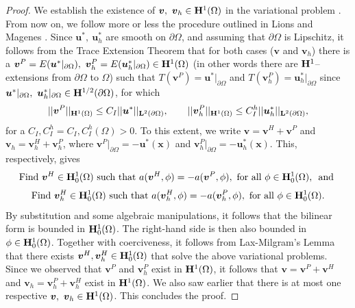 \documentclass[pdflatex,sn-mathphys-num]{sn-jnl}
\newtheorem*{lemma star}{Lemma}
\begin{document}
\begin{appendices}
\begin{proof}
We establish the existence of ${\boldsymbol v},~{\boldsymbol v}_h \in {\bf H}^1(\Omega)$ in the variational problem \citep{Fichera1973,Lions2005}. From now on, we follow more or less the procedure outlined in Lions and Magenes \cite{lions2012non}. Since ${\boldsymbol u}^*,~{\boldsymbol u}_h^*$ are smooth on $\partial \Omega$, and assuming that $\partial \Omega$ is Lipschitz, it follows from the Trace Extension Theorem \citep{adams2003sobolev} that for both cases (${\boldsymbol v}$ and ${\boldsymbol v}_h$) there is a ${\boldsymbol v}^P = E({\boldsymbol u}^*|_{\partial \Omega}),~
{\boldsymbol v}_h^P = E({\boldsymbol u}_h^*|_{\partial \Omega})\in {{\bf H}^1(\Omega)}$ (in other words there are ${\bf H}^1$--extensions from $\partial \Omega$ to $\Omega$) such that $T({\boldsymbol v}^P) = {\boldsymbol u}^*|_{\partial \Omega}$ and $T({\boldsymbol v}_h^P) = {\boldsymbol u}_h^*|_{\partial \Omega}$ since ${\boldsymbol u}^*|_{\partial \Omega},~{\boldsymbol u}_h^*|_{\partial \Omega} \in {{\bf H}^{1/2}(\partial \Omega)}$, for which $$||{\boldsymbol v}^P||_{{{\bf H}^1(\Omega)}} \le C_I ||{\boldsymbol u}^*||_{{{\bf L}^2(\partial \Omega)}}, \qquad ||{\boldsymbol v}_h^P||_{{{\bf H}^1(\Omega)}} \le C_I^h ||{\boldsymbol u}_h^*||_{{{\bf L}^2(\partial \Omega)}},$$ for a $C_I, C_I^h = C_I,C_I^h(\Omega) > 0$. To this extent, we write ${\boldsymbol v} = {\boldsymbol v}^H + {\boldsymbol v}^P$ and ${\boldsymbol v}_h = {\boldsymbol v}_h^H + {\boldsymbol v}_h^P$, where ${\boldsymbol v}^P |_{\partial \Omega} = -{\boldsymbol u}^*(\boldsymbol{x})$ and ${\boldsymbol v}_h^P |_{\partial \Omega} = -{\boldsymbol u}_h^*(\boldsymbol{x})$. This, respectively, gives
\begin{align*}
\text{Find ${\boldsymbol v}^H \in {{\bf H}^1_0(\Omega)}$ such that }
a({\boldsymbol v}^H,\phi) = -a({\boldsymbol v}^P,\phi), \text{ for all $\phi \in {{\bf H}_0^1(\Omega)}$, \text{ and }}
\end{align*}
\begin{align*}
\text{Find ${\boldsymbol v}_h^H \in {{\bf H}^1_0(\Omega)}$ such that }
a({\boldsymbol v}_h^H,\phi) = -a({\boldsymbol v}_h^P,\phi), \text{ for all $\phi \in {{\bf H}_0^1(\Omega)}$.}
\end{align*}
By substitution and some algebraic manipulations, it follows that the bilinear form is bounded in ${\bf H}^1_0(\Omega)$. The right-hand side is then also bounded in $\phi \in {{\bf H}^1_0(\Omega)}$. Together with coerciveness, it follows from Lax-Milgram's Lemma that there exists ${\boldsymbol v}^H, {\boldsymbol v}_h^H \in {\bf H}_0^1(\Omega)$ that solve the above variational problems. Since we observed that ${\boldsymbol v}^P$ and ${\boldsymbol v}_h^P$ exist in ${\bf H}^1(\Omega)$, it follows that ${\boldsymbol v} = {\boldsymbol v}^P + {\boldsymbol v}^H$ and ${\boldsymbol v}_h = {\boldsymbol v}_h^P + {\boldsymbol v}_h^H$ exist in ${\bf H}^1(\Omega)$. We also saw earlier that there is at most one respective ${\boldsymbol v}, ~{\boldsymbol v}_h \in{\bf H}^1(\Omega)$. This concludes the proof.
\end{proof}

\end{appendices}


\end{document}
